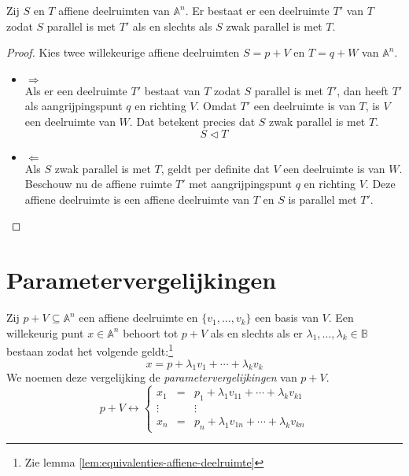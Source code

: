 \documentclass[main.tex]{subfiles}
\begin{document}
\begin{st}
  Zij $S$ en $T$ affiene deelruimten van $\mathbb{A}^{n}$.
  Er bestaat er een deelruimte $T'$ van $T$ zodat $S$ parallel is met $T'$ als en slechts als $S$ zwak parallel is met $T$.

  \begin{proof}
    Kies twee willekeurige affiene deelruimten $S = p + V$ en $T = q + W$ van $\mathbb{A}^{n}$.
    \begin{itemize}
    \item $\Rightarrow$\\
      Als er een deelruimte $T'$ bestaat van $T$ zodat $S$ parallel is met $T'$, dan heeft $T'$ als aangrijpingspunt $q$ en richting $V$.
      Omdat $T'$ een deelruimte is van $T$, is $V$ een deelruimte van $W$.
      Dat betekent precies dat $S$ zwak parallel is met $T$.
      \[ S \vartriangleleft T \]
    \item $\Leftarrow$\\
      Als $S$ zwak parallel is met $T$, geldt per definite dat $V$ een deelruimte is van $W$.
      Beschouw nu de affiene ruimte $T'$ met aangrijpingspunt $q$ en richting $V$.
      Deze affiene deelruimte is een affiene deelruimte van $T$ en $S$ is parallel met $T'$.
    \end{itemize}
  \end{proof}
\end{st}

\section{Parametervergelijkingen}
\label{sec:parametervergelijkingen}
\begin{de}
  Zij $p+V \subseteq \mathbb{A}^{n}$ een affiene deelruimte en $\{v_{1},\dotsc,v_{k}\}$ een basis van $V$.
  Een willekeurig punt $x\in \mathbb{A}^{n}$ behoort tot $p+V$ als en slechts als er $\lambda_{1},\dotsc,\lambda_{k} \in \mathbb{B}$ bestaan zodat het volgende geldt:\footnote{Zie lemma \ref{lem:equivalenties-affiene-deelruimte}}
  \[
  x = p + \lambda_1v_1 + \dotsb + \lambda_{k}v_{k}  
  \]
  We noemen deze vergelijking de \emph{parametervergelijkingen} van $p+V$.
  \[
  p+V \leftrightarrow
  \left\{
  \begin{array}{rcl}
  x_{1} &=& p_{1} + \lambda_{1}v_{11} + \dotsb + \lambda_{k}v_{k1}\\
  \vdots && \vdots\\
  x_{n} &=& p_{n} + \lambda_{1}v_{1n} + \dotsb + \lambda_{k}v_{kn}
  \end{array}
  \right.
  \]
\end{de}
\end{document}
